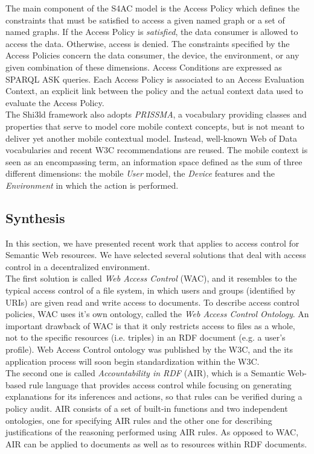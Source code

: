 The main component of the S4AC model is the Access Policy which defines the constraints that must be satisfied to access a given named graph or a set of named graphs. If the Access Policy is \textit{satisfied}, the data consumer is allowed to access the data. Otherwise, access is denied. The constraints specified by the Access Policies concern the data consumer, the device, the environment, or any given combination of these dimensions. Access Conditions are expressed as SPARQL ASK queries. Each Access Policy is associated to an Access
Evaluation Context, an explicit link between the policy and the actual context data used to evaluate the Access Policy.\\

The Shi3ld framework also adopts \textit{PRISSMA}, a vocabulary providing classes and properties that serve to model core mobile context concepts, but is not meant to deliver yet another mobile contextual model. Instead, well-known Web of Data vocabularies and recent W3C recommendations are reused. The mobile context is seen as an encompassing term, an information space defined as the sum of three different dimensions: the mobile \textit{User} model, the \textit{Device} features and the \textit{Environment} in which the action is performed.\\

\subsection{Synthesis}
In this section, we have presented recent work that applies to access control for Semantic Web resources. We have selected several solutions that deal with access control in a decentralized environment.\\

The first solution is called \textit{Web Access Control} (WAC), and it resembles to the typical access control of a file system, in which users and groups (identified by URIs) are given read and write access to documents. To describe access control policies, WAC uses it's own ontology, called the \textit{Web Access Control Ontology}. An important drawback of WAC is that it only restricts access to files as a whole, not to the specific resources (i.e. triples) in an RDF document (e.g. a user's profile). Web Access Control ontology was published by the W3C, and the its application process will soon begin standardization within the W3C.\\

The second one is called \textit{Accountability in RDF} (AIR), which is a Semantic Web-based rule language that provides access control while focusing on generating explanations for its inferences and actions, so that rules can be verified during a policy audit. AIR consists of a set of built-in functions and two independent ontologies, one for specifying AIR rules and the other one for describing justifications of the reasoning performed using AIR rules. As opposed to WAC, AIR can be applied to documents as well as to resources within RDF documents.\\

